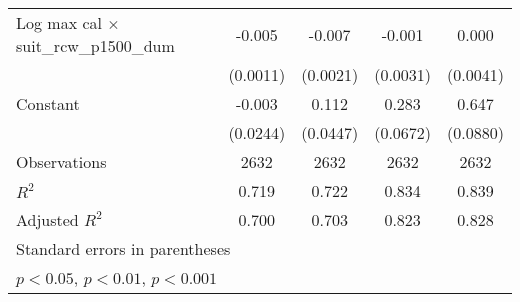 {\begin{tabular}{l*{4}{c}}
\addlinespace
Log max cal $\times$ suit\_rcw\_p1500\_dum&      -0.005\sym{***}&      -0.007\sym{***}&      -0.001         &       0.000         \\
                    &    (0.0011)         &    (0.0021)         &    (0.0031)         &    (0.0041)         \\
\addlinespace
Constant            &      -0.003         &       0.112\sym{*}  &       0.283\sym{***}&       0.647\sym{***}\\
                    &    (0.0244)         &    (0.0447)         &    (0.0672)         &    (0.0880)         \\
\midrule
Observations        &        2632         &        2632         &        2632         &        2632         \\
\(R^{2}\)           &       0.719         &       0.722         &       0.834         &       0.839         \\
Adjusted \(R^{2}\)  &       0.700         &       0.703         &       0.823         &       0.828         \\
\bottomrule
\multicolumn{5}{l}{\footnotesize Standard errors in parentheses}\\
\multicolumn{5}{l}{\footnotesize \sym{*} \(p<0.05\), \sym{**} \(p<0.01\), \sym{***} \(p<0.001\)}\\
\end{tabular}
}
